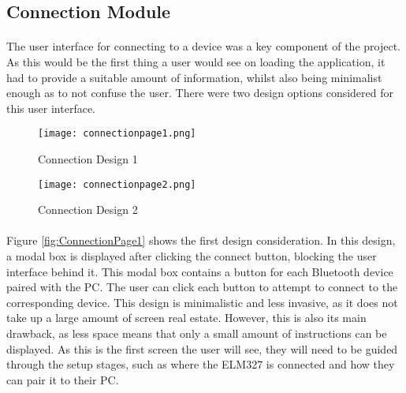 	\subsection{Connection Module}{
		\paragraph{}{
		The user interface for connecting to a device was a key component of the project. As this would be the first thing a user would see on loading the application, it had to provide a suitable amount of information, whilst also being minimalist enough as to not confuse the user. There were two design options considered for this user interface. 
		}

		\begin{figure}[h]
			\begin{center}								
				\begin{minipage}{0.49\textwidth}
					\texttt{[image: connectionpage1.png]}
					\caption{Connection Design 1}						
					\label{fig:ConnectionPage1}
				\end{minipage}
				\hfill			
				\begin{minipage}{0.49\textwidth}
					\texttt{[image: connectionpage2.png]}
					\caption{Connection Design 2}						
					\label{fig:ConnectionPage2}
				\end{minipage}									
			\end{center}
		\end{figure}
		
		\paragraph{}{
		Figure \ref{fig:ConnectionPage1} shows the first design consideration. In this design, a modal box is displayed after clicking the connect button, blocking the user interface behind it. This modal box contains a button for each Bluetooth device paired with the PC. The user can click each button to attempt to connect to the corresponding device. This design is minimalistic and less invasive, as it does not take up a large amount of screen real estate. However, this is also its main drawback, as less space means that only a small amount of instructions can be displayed. As this is the first screen the user will see, they will need to be guided through the setup stages, such as where the ELM327 is connected and how they can pair it to their PC.
		}
		
}
